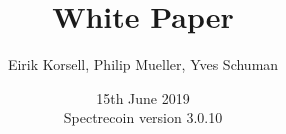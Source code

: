\author{Eirik Korsell, Philip Mueller, Yves Schuman}
\title{White Paper}
\date{15th June 2019\\
	Spectrecoin version 3.0.10}

\maketitle